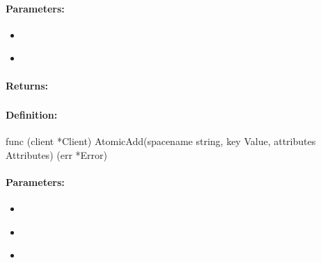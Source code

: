 \paragraph{Parameters:}
\begin{itemize}[noitemsep]
\item {}\\

\item {}\\

\end{itemize}

\paragraph{Returns:}


\pagebreak
\subsubsection{}
\label{api:Go:AtomicAdd}


\paragraph{Definition:}
\begin{gocode}
func (client *Client) AtomicAdd(spacename string, key Value, attributes Attributes) (err *Error)
\end{gocode}

\paragraph{Parameters:}
\begin{itemize}[noitemsep]
\item {}\\

\item {}\\

\item {}\\

\end{itemize}

